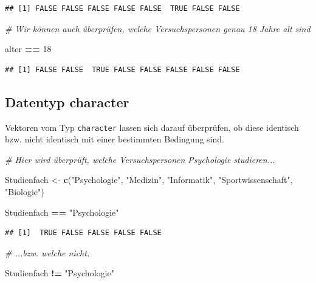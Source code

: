 \documentclass[
  ngerman,
]{book}
\newenvironment{Shaded}{\begin{snugshade}}{\end{snugshade}}
\newcommand{\CommentTok}[1]{\textcolor[rgb]{0.56,0.35,0.01}{\textit{#1}}}
\newcommand{\DecValTok}[1]{\textcolor[rgb]{0.00,0.00,0.81}{#1}}
\newcommand{\FunctionTok}[1]{\textcolor[rgb]{0.13,0.29,0.53}{\textbf{#1}}}
\newcommand{\NormalTok}[1]{#1}
\newcommand{\OtherTok}[1]{\textcolor[rgb]{0.56,0.35,0.01}{#1}}
\newcommand{\SpecialCharTok}[1]{\textcolor[rgb]{0.81,0.36,0.00}{\textbf{#1}}}
\newcommand{\StringTok}[1]{\textcolor[rgb]{0.31,0.60,0.02}{#1}}
\begin{document}
\begin{verbatim}
## [1] FALSE FALSE FALSE FALSE FALSE  TRUE FALSE FALSE
\end{verbatim}

\begin{Shaded}
\begin{Highlighting}[]
\CommentTok{\# Wir können auch überprüfen, welche Versuchspersonen genau 18 Jahre alt sind}

\NormalTok{alter }\SpecialCharTok{==} \DecValTok{18}
\end{Highlighting}
\end{Shaded}

\begin{verbatim}
## [1] FALSE FALSE  TRUE FALSE FALSE FALSE FALSE FALSE
\end{verbatim}

\subsection{Datentyp character}\label{datentyp-character-1}

Vektoren vom Typ \texttt{character} lassen sich darauf überprüfen, ob diese identisch bzw. nicht identisch mit einer bestimmten Bedingung sind.

\begin{Shaded}
\begin{Highlighting}[]
\CommentTok{\# Hier wird überprüft, welche Versuchspersonen Psychologie studieren...}

\NormalTok{Studienfach }\OtherTok{\textless{}{-}} \FunctionTok{c}\NormalTok{(}\StringTok{"Psychologie"}\NormalTok{, }\StringTok{"Medizin"}\NormalTok{, }\StringTok{"Informatik"}\NormalTok{, }\StringTok{"Sportwissenschaft"}\NormalTok{, }\StringTok{"Biologie"}\NormalTok{)}

\NormalTok{Studienfach }\SpecialCharTok{==} \StringTok{"Psychologie"}
\end{Highlighting}
\end{Shaded}

\begin{verbatim}
## [1]  TRUE FALSE FALSE FALSE FALSE
\end{verbatim}

\begin{Shaded}
\begin{Highlighting}[]
\CommentTok{\# ...bzw. welche nicht.}

\NormalTok{Studienfach }\SpecialCharTok{!=} \StringTok{"Psychologie"}
\end{Highlighting}
\end{Shaded}
\end{document}
